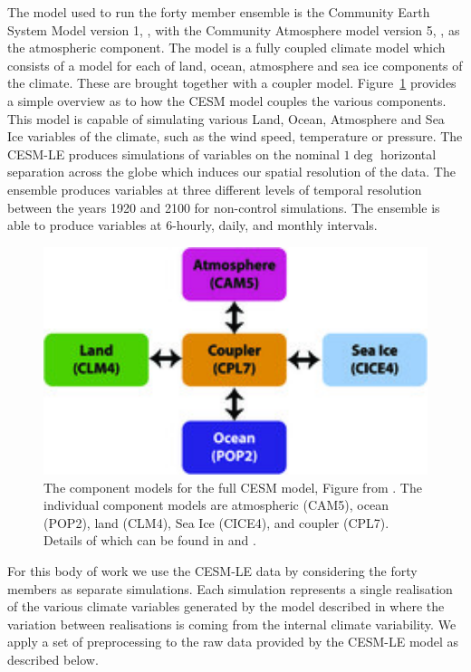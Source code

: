  The model used to run the forty member ensemble is the Community Earth System Model version 1, \citep{hurrell_community_2013}, with the Community Atmosphere model version 5, \citep{hurrell_community_2013}, as the atmospheric component.
 The model is a fully coupled climate model which consists of a model for each of land, ocean, atmosphere and sea ice components of the climate.
 These are brought together with a coupler model.
 Figure~\ref{fig:cesm} provides a simple overview as to how the CESM model couples the various components.
 This  model is capable of simulating various Land, Ocean, Atmosphere and Sea Ice variables of the climate, such as the wind speed, temperature or pressure.
 The CESM-LE produces simulations of variables on the nominal $1\deg$ horizontal separation across the globe which induces our spatial resolution of the data.
 The ensemble produces variables at three different levels of temporal resolution between the years 1920 and 2100 for non-control simulations. The ensemble is able to produce variables at 6-hourly, daily, and monthly intervals. 
 
 \begin{figure}[htbp!] 
 	\centering    
 	\includegraphics[width=1.0\textwidth]{cesm_components}
 	\caption[CESM component models]{The component models for the full CESM model, Figure from \citep{kay_community_2015}. The individual component models are atmospheric (CAM5), ocean (POP2), land (CLM4), Sea Ice (CICE4), and coupler (CPL7). Details of which can be found in \citep{kay_community_2015} and \citep{hurrell_community_2013}.}
 	\label{fig:cesm}
 \end{figure}

 For this body of work we use the CESM-LE data by considering the forty members as separate simulations.
 Each simulation represents a single realisation of the various climate variables generated by the model described in \citep{kay_community_2015} where the variation between realisations is coming from the internal climate variability. 
 We apply a set of preprocessing to the raw data provided by the CESM-LE model as described below. 
 
